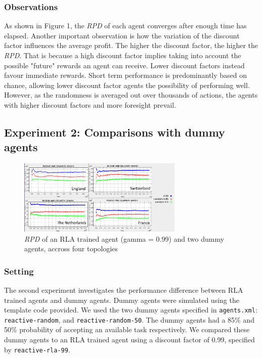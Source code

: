 \documentclass[11pt]{article}
\begin{document}
\subsubsection{Observations}
As shown in Figure 1, the \textit{RPD} of each agent converges after enough time has elapsed. Another important observation is how the variation of the discount factor influences the average profit. The higher the discount factor, the higher the \textit{RPD}. That is because a high discount factor implies taking into account the possible "future" rewards an agent can receive. Lower discount factors instead favour immediate rewards. Short term performance is predominantly based on chance, allowing lower discount factor agents the possibility of performing well. However, as the randomness is averaged out over thousands of actions, the agents with higher discount factors and more foresight prevail.\\

\subsection{Experiment 2: Comparisons with dummy agents}
\begin{figure}
	\centering
	\includegraphics[width=0.7\textwidth]{ex2}
	\caption{\textit{RPD} of an RLA trained agent (gamma = 0.99) and two dummy agents, accross four topologies}
	\label{figure:1}
\end{figure}
\subsubsection{Setting}
The second experiment investigates the performance difference between RLA trained agents and dummy agents. Dummy agents were simulated using the template code provided. We used the two dummy agents specified in \texttt{agents.xml}: \texttt{reactive-random}, and \texttt{reactive-random-50}. The dummy agents had a 85\% and 50\% probability of accepting an available task respectively. We compared these dummy agents to an RLA trained agent using a discount factor of 0.99, specified by \texttt{reactive-rla-99}.\\
\\
\\
\end{document}
